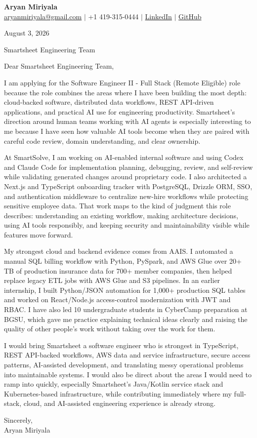 \documentclass[letterpaper,11pt]{article}
\begin{document}
{\Large\textbf{Aryan Miriyala}}\\
\href{mailto:aryanmiriyala@gmail.com}{aryanmiriyala@gmail.com} $|$ +1 419-315-0444 $|$
\href{https://www.linkedin.com/in/aryan-miriyala-7788a21b6/}{LinkedIn} $|$
\href{https://github.com/aryanmiriyala}{GitHub}

August 3, 2026

Smartsheet Engineering Team

Dear Smartsheet Engineering Team,

I am applying for the Software Engineer II - Full Stack (Remote Eligible) role because the role combines the areas where I have been building the most depth: cloud-backed software, distributed data workflows, REST API-driven applications, and practical AI use for engineering productivity. Smartsheet's direction around human teams working with AI agents is especially interesting to me because I have seen how valuable AI tools become when they are paired with careful code review, domain understanding, and clear ownership.

At SmartSolve, I am working on AI-enabled internal software and using Codex and Claude Code for implementation planning, debugging, review, and self-review while validating generated changes around proprietary code. I also architected a Next.js and TypeScript onboarding tracker with PostgreSQL, Drizzle ORM, SSO, and authentication middleware to centralize new-hire workflows while protecting sensitive employee data. That work maps to the kind of judgment this role describes: understanding an existing workflow, making architecture decisions, using AI tools responsibly, and keeping security and maintainability visible while features move forward.

My strongest cloud and backend evidence comes from AAIS. I automated a manual SQL billing workflow with Python, PySpark, and AWS Glue over 20+ TB of production insurance data for 700+ member companies, then helped replace legacy ETL jobs with AWS Glue and S3 pipelines. In an earlier internship, I built Python/JSON automation for 1,000+ production SQL tables and worked on React/Node.js access-control modernization with JWT and RBAC. I have also led 10 undergraduate students in CyberCamp preparation at BGSU, which gave me practice explaining technical ideas clearly and raising the quality of other people's work without taking over the work for them.

I would bring Smartsheet a software engineer who is strongest in TypeScript, REST API-backed workflows, AWS data and service infrastructure, secure access patterns, AI-assisted development, and translating messy operational problems into maintainable systems. I would also be direct about the areas I would need to ramp into quickly, especially Smartsheet's Java/Kotlin service stack and Kubernetes-based infrastructure, while contributing immediately where my full-stack, cloud, and AI-assisted engineering experience is already strong.

Sincerely,\\
Aryan Miriyala
\end{document}
